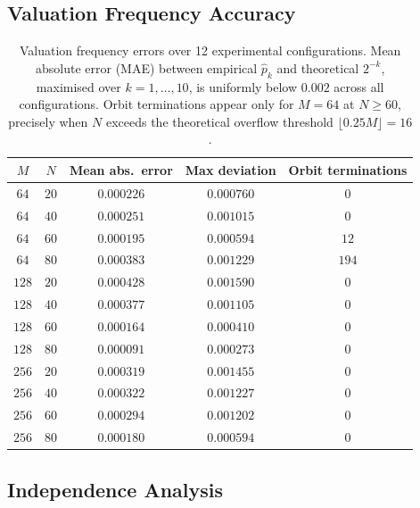 \documentclass[12pt]{article}
\theoremstyle{definition}
\theoremstyle{remark}
\begin{document}
\subsection{Valuation Frequency Accuracy}

\begin{table}[h]
\centering
\begin{tabular}{ccccc}\toprule
$M$&$N$&Mean abs.\ error&Max deviation&Orbit terminations\\\midrule
$64$&$20$&$0.000226$&$0.000760$&$0$\\
$64$&$40$&$0.000251$&$0.001015$&$0$\\
$64$&$60$&$0.000195$&$0.000594$&$12$\\
$64$&$80$&$0.000383$&$0.001229$&$194$\\
$128$&$20$&$0.000428$&$0.001590$&$0$\\
$128$&$40$&$0.000377$&$0.001105$&$0$\\
$128$&$60$&$0.000164$&$0.000410$&$0$\\
$128$&$80$&$0.000091$&$0.000273$&$0$\\
$256$&$20$&$0.000319$&$0.001455$&$0$\\
$256$&$40$&$0.000322$&$0.001227$&$0$\\
$256$&$60$&$0.000294$&$0.001202$&$0$\\
$256$&$80$&$0.000180$&$0.000594$&$0$\\\bottomrule
\end{tabular}
\caption{Valuation frequency errors over 12 experimental configurations.
Mean absolute error (MAE) between empirical $\hat{p}_k$ and
theoretical $2^{-k}$, maximised over $k=1,\ldots,10$,
is uniformly below $0.002$ across all configurations.
Orbit terminations appear only for $M=64$ at $N\geq 60$,
precisely when $N$ exceeds the theoretical overflow threshold
$\lfloor 0.25M\rfloor=16$.}
\label{tab:freq}
\end{table}

\subsection{Independence Analysis}
\end{document}
